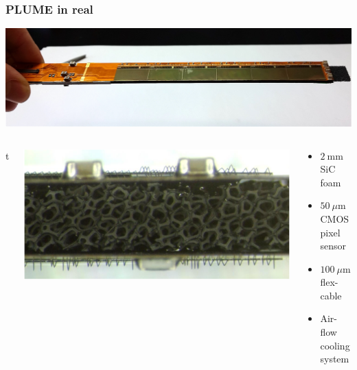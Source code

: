 \documentclass{beamer}
\begin{document}

\begin{frame}
  \frametitle{PLUME in real}

  \begin{center}
    \includegraphics[width = \textwidth]{Pictures/plume2.jpg}
  \end{center}
  
  \begin{columns}{t}
    \begin{column}{0.5\textwidth}
      \centering
      \includegraphics[width = \textwidth]{Pictures/SiC.png}
    \end{column}
    \begin{column}{0.5\textwidth}
      \begin{itemize}
        \item $2~\text{mm}$ SiC foam
        \item $50~\mu\text{m}$ CMOS pixel sensor
        \item $100~\mu\text{m}$ flex-cable
        \item Air-flow cooling system
      \end{itemize}
    \end{column}
  \end{columns}
\end{frame}

\end{document}
